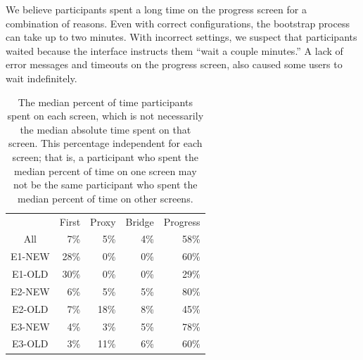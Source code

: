 \documentclass[USenglish,oneside,twocolumn]{article}
\begin{document}
We believe participants spent a long time on the progress screen for a combination of reasons. Even with correct configurations, the bootstrap process can take up to two minutes. With incorrect settings, we suspect that participants waited because the interface instructs them ``wait a couple minutes.'' A lack of error messages and timeouts on the progress screen, also caused some users to wait indefinitely. 

\begin{table}[t]
\centering
	\begin{tabular}{c r r r r}
	& First & Proxy & Bridge & Progress \\
	\noalign{\hrule}
	All & 7\% & 5\% & 4\% & 58\% \\
	E1-NEW & 28\% & 0\% & 0\% & 60\% \\
	E1-OLD & 30\% & 0\% & 0\% & 29\% \\
	E2-NEW & 6\% & 5\% & 5\% & 80\% \\
	E2-OLD & 7\% & 18\% & 8\% & 45\% \\
	E3-NEW & 4\% & 3\% & 5\% & 78\% \\
	E3-OLD & 3\% & 11\% & 6\% & 60\% \\
	\end{tabular}
\caption{The median percent of time participants spent on each screen, which is not
necessarily the median absolute time spent on that screen. 
This percentage independent for each screen; that is, a participant who spent the median percent 
of time on one screen may not be the same participant who spent the median percent
of time on other screens.} 
\label{table:median_time}
\end{table}
\end{document}
